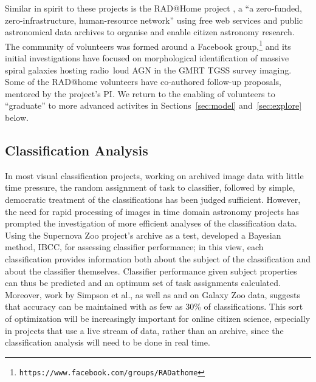 \documentclass{ar2e}
\def\url#1{\texttt{#1}}
\begin{document}
Similar in spirit to these projects is the RAD@Home project \citep{Hota2014},
a ``a zero-funded, zero-infrastructure, human-resource network'' using free
web services and public astronomical data archives to organise and enable
citizen astronomy research. The community of volunteers was formed around a
Facebook group,\footnote{\url{https://www.facebook.com/groups/RADathome}} and
its initial investigations have focused on morphological identification of
massive spiral galaxies hosting  radio~loud AGN \citep{Hota2011} in the GMRT
TGSS survey imaging.  Some of the RAD@home volunteers have co-authored
follow-up proposals, mentored by the project's PI. We return to the enabling
of volunteers to ``graduate'' to more advanced activites in
Sections~\ref{sec:model} and~\ref{sec:explore} below. 



\subsection{Classification Analysis}
\label{sec:class:analysis}

In most visual classification projects, working on archived image data with
little time pressure, the random assignment of task to classifier, followed by
simple, democratic treatment of the classifications has been judged
sufficient. However, the need for rapid processing of images in time domain
astronomy projects has prompted the investigation of more efficient analyses
of the classification data.  Using the Supernova Zoo project's archive as a
test, \citet{Simpson++2012IBCC} developed a Bayesian method, IBCC, for
assessing classifier performance; in this view, each classification provides
information both about the subject of the classification and about the
classifier themselves. Classifier performance given subject properties can
thus be predicted and an optimum set of task assignments calculated. 
Moreover, work by Simpson et al., as well as \citet{Kamar} and
\citet{Waterhouse} on Galaxy Zoo data, suggests that accuracy can be
maintained with as few as 30\% of classifications.  This sort of optimization
will be increasingly important for online citizen science, especially in
projects that use a live stream of data, rather than an archive, since the
classification analysis will need to be done in real time.

\end{document}
